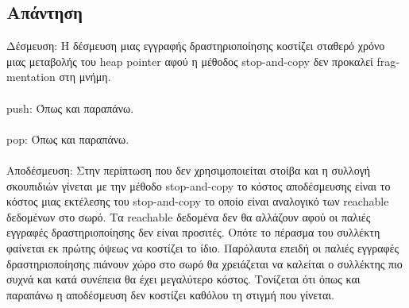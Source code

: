 \documentclass[a4paper]{article}
\begin{document}
\subsection*{Απάντηση}
Δέσμευση: Η δέσμευση μιας εγγραφής δραστηριοποίησης κοστίζει σταθερό χρόνο μιας μεταβολής του \foreignlanguage{english}{heap pointer} αφού η μέθοδος \foreignlanguage{english}{stop-and-copy} δεν προκαλεί \foreignlanguage{english}{fragmentation} στη μνήμη. \\\\
\foreignlanguage{english}{push}: Όπως και παραπάνω. \\\\
\foreignlanguage{english}{pop}: Όπως και παραπάνω. \\\\
Αποδέσμευση: Στην περίπτωση που δεν χρησιμοποιείται στοίβα και η συλλογή σκουπιδιών γίνεται με την μέθοδο \foreignlanguage{english}{stop-and-copy} το κόστος αποδέσμευσης είναι το κόστος μιας εκτέλεσης του \foreignlanguage{english}{stop-and-copy} το οποίο είναι αναλογικό των \foreignlanguage{english}{reachable} δεδομένων στο σωρό. Τα \foreignlanguage{english}{reachable} δεδομένα δεν θα αλλάζουν αφού οι παλιές εγγραφές δραστηριοποίησης δεν είναι προσιτές. Οπότε το πέρασμα του συλλέκτη φαίνεται εκ πρώτης όψεως να κοστίζει το ίδιο. Παρόλαυτα επειδή οι παλιές εγγραφές δραστηριοποίησης πιάνουν χώρο στο σωρό θα χρειάζεται να καλείται ο συλλέκτης πιο συχνά και κατά συνέπεια θα έχει μεγαλύτερο κόστος. Τονίζεται ότι όπως και παραπάνω η αποδέσμευση δεν κοστίζει καθόλου τη στιγμή που γίνεται.
\end{document}
